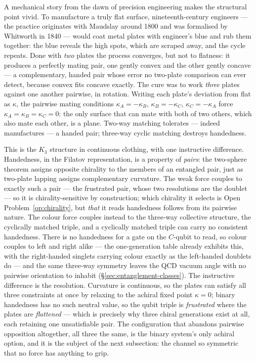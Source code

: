 A mechanical story from the dawn of precision engineering makes the structural point vivid. To
manufacture a truly flat surface, nineteenth-century engineers --- the practice originates with
Maudslay around 1800 and was formalised by Whitworth in 1840 --- would coat metal plates with
engineer's blue and rub them together: the blue reveals the high spots, which are scraped away, and
the cycle repeats. Done with \emph{two} plates the process converges, but not to flatness: it
produces a perfectly mating pair, one gently convex and the other gently concave --- a
complementary, handed pair whose error no two-plate comparison can ever detect, because convex fits
concave exactly. The cure was to work \emph{three} plates against one another pairwise, in
rotation. Writing each plate's deviation from flat as $\kappa$, the pairwise mating conditions
$\kappa_A = -\kappa_B$, $\kappa_B = -\kappa_C$, $\kappa_C = -\kappa_A$ force
$\kappa_A = \kappa_B = \kappa_C = 0$: the only surface that can mate with both of two others, which
also mate each other, is a plane. Two-way matching tolerates --- indeed manufactures --- a handed
pair; three-way cyclic matching destroys handedness.

This is the $K_3$ structure in continuous clothing, with one instructive difference. Handedness, in
the Filatov representation, is a property of \emph{pairs}: the two-sphere theorem assigns opposite
chirality to the members of an entangled pair, just as two-plate lapping assigns complementary
curvature. The weak force couples to exactly such a pair --- the frustrated pair, whose two
resolutions are the doublet --- so it is chirality-sensitive by construction; which chirality it
selects is Open Problem~\ref{op:chirality}, but \emph{that} it reads handedness follows from its
pairwise nature. The colour force couples instead to the three-way collective structure, the
cyclically matched triple, and a cyclically matched triple can carry no consistent handedness. There
is no handedness for a gate on the $C$-qubit to read, so colour couples to left and right alike ---
the one-generation table already exhibits this, with the right-handed singlets carrying colour
exactly as the left-handed doublets do --- and the same three-way symmetry leaves the QCD vacuum
angle with no pairwise orientation to inhabit (\S\ref{sec:entanglement-classes}). The instructive
difference is the resolution. Curvature is continuous, so the plates can satisfy all three
constraints at once by relaxing to the achiral fixed point $\kappa = 0$; binary handedness has no
such neutral value, so the qubit triple is \emph{frustrated} where the plates are \emph{flattened}
--- which is precisely why three chiral generations exist at all, each retaining one unsatisfiable
pair. The configuration that abandons pairwise opposition altogether, all three the same, is the
binary system's only achiral option, and it is the subject of the next subsection: the channel so
symmetric that no force has anything to grip.


